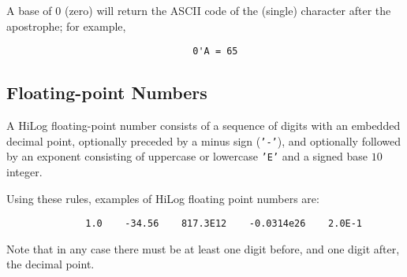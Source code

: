 A base of $0$ (zero) will return the ASCII code of the (single) character
after the apostrophe; for example,
\begin{verbatim}
                                 0'A = 65
\end{verbatim}


\subsection{Floating-point Numbers}
A HiLog floating-point number consists of a sequence of digits with an
embedded decimal point, optionally preceded by a minus sign ({\tt '-'}), and
optionally followed by an exponent consisting of uppercase or lowercase
{\tt 'E'} and a signed base $10$ integer.

Using these rules, examples of HiLog floating point numbers are:
\begin{verbatim}
              1.0    -34.56    817.3E12    -0.0314e26    2.0E-1
\end{verbatim}
Note that in any case there must be at least one digit before, and one digit
after, the decimal point.


